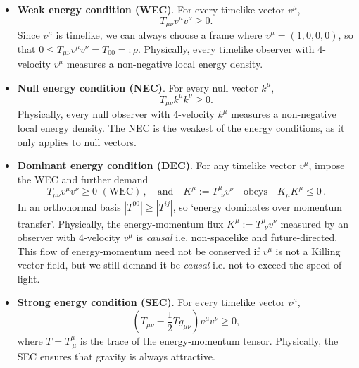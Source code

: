 \documentclass[../geometry_main.tex]{subfiles}
\begin{document}
\begin{itemize}
    \item \textbf{Weak energy condition (WEC)}. For every timelike vector $v^\mu$,
    \begin{equation}
        T_{\mu\nu} v^\mu v^\nu \ge 0.
    \end{equation}
    Since $v^\mu$ is timelike, we can always choose a frame where $v^\mu = (1,0,0,0)$, so that $0\leq T_{\mu\nu} v^\mu v^\nu = T_{00} =:\rho$.
    Physically, every timelike observer with 4-velocity $v^\mu$ measures a non-negative local energy density.
    \item \textbf{Null energy condition (NEC)}. For every null vector $k^\mu$,
    \begin{equation}
        T_{\mu\nu} k^\mu k^\nu \ge 0.
    \end{equation}
    Physically, every null observer with 4-velocity $k^\mu$ measures a non-negative local energy density.
    The NEC is the weakest of the energy conditions, as it only applies to null vectors.
    \item \textbf{Dominant energy condition (DEC)}. For any timelike vector $v^\mu$, impose the WEC and further demand
    \begin{equation}
        T_{\mu\nu} v^\mu v^\nu \ge 0\,\,(\mathrm{WEC})\,,\quad \text{and}\quad K^\mu := T^{\mu}_{~~\nu} v^\nu \quad \text{obeys} \quad K_\mu K^\mu \le 0\,.
    \end{equation}
    In an orthonormal basis $|T^{00}| \ge |T^{ij}|$, so `energy dominates over momentum transfer'.
    Physically, the energy-momentum flux $K^\mu := T^{\mu}_{~~\nu} v^\nu$ measured by an observer with $4$-velocity $v^\mu$ is \emph{causal} i.e. non-spacelike and future-directed.
    This flow of energy-momentum need not be conserved if $v^\mu$ is not a Killing vector field, but we still demand it be \emph{causal} i.e. not to exceed the speed of light.
    \item \textbf{Strong energy condition (SEC)}. For every timelike vector $v^\mu$,
    \begin{equation}
        \left(T_{\mu\nu} - \frac{1}{2} T g_{\mu\nu}\right) v^\mu v^\nu \ge 0,
    \end{equation}
    where $T = T^\mu_{~\mu}$ is the trace of the energy-momentum tensor.
    Physically, the SEC ensures that gravity is always attractive.
\end{itemize}
%
\end{document}
